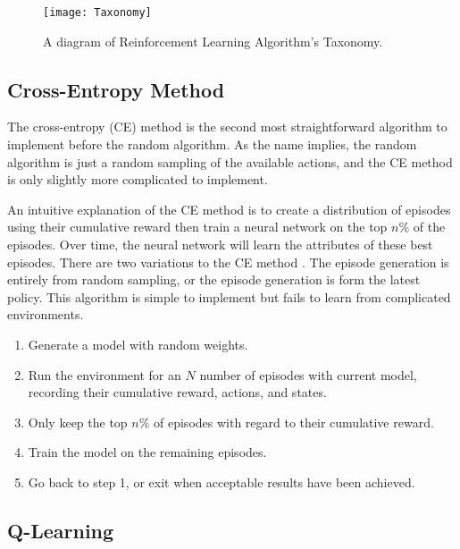 \begin{figure}
	\centering
	\texttt{[image: Taxonomy]}
	\caption{A diagram of Reinforcement Learning Algorithm's Taxonomy.}
	\label{fig:rltaxonomy}
\end{figure}

\subsection{Cross-Entropy Method}

The cross-entropy (CE) method is the second most straightforward algorithm to implement before the random algorithm. As the name implies, the random algorithm is just a random sampling of the available actions, and the CE method is only slightly more complicated to implement.

An intuitive explanation of the CE method is to create a distribution of episodes using their cumulative reward then train a neural network on the top $n$\% of the episodes. Over time, the neural network will learn the attributes of these best episodes. There are two variations to the CE method \cite{boer_kroese_mannor_rubinstein_2005}. The episode generation is entirely from random sampling, or the episode generation is form the latest policy. This algorithm is simple to implement but fails to learn from complicated environments. 

\begin{enumerate}[label=Step \arabic*:, itemsep=0mm]
	\item Generate a model with random weights.
	\item Run the environment for an $N$ number of episodes with current model, recording their cumulative reward, actions, and states.
	\item Only keep the top $n$\% of episodes with regard to their cumulative reward.
	\item Train the model on the remaining episodes.
	\item Go back to step 1, or exit when acceptable results have been achieved.
\end{enumerate}

\subsection{Q-Learning}

